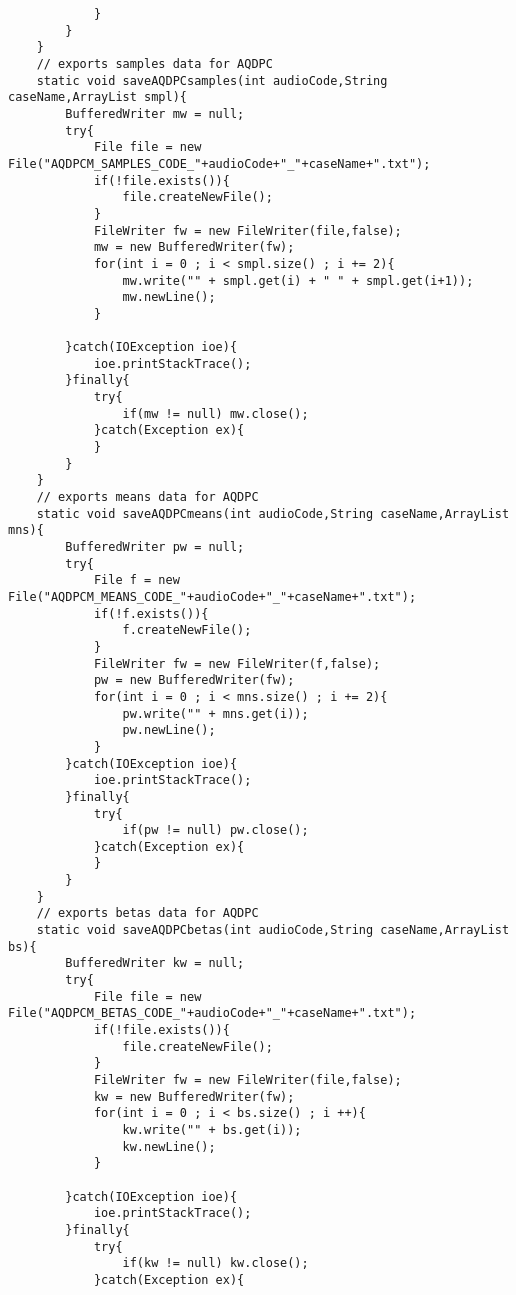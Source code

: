 \documentclass{article}
\begin{document}
\begin{lstlisting}
            }
        }
    }
    // exports samples data for AQDPC
    static void saveAQDPCsamples(int audioCode,String caseName,ArrayList smpl){
        BufferedWriter mw = null;
        try{
            File file = new File("AQDPCM_SAMPLES_CODE_"+audioCode+"_"+caseName+".txt");
            if(!file.exists()){
                file.createNewFile();
            }
            FileWriter fw = new FileWriter(file,false);
            mw = new BufferedWriter(fw);
            for(int i = 0 ; i < smpl.size() ; i += 2){
                mw.write("" + smpl.get(i) + " " + smpl.get(i+1));
                mw.newLine();
            }

        }catch(IOException ioe){
            ioe.printStackTrace();
        }finally{
            try{
                if(mw != null) mw.close();
            }catch(Exception ex){
            }
        }
    }
    // exports means data for AQDPC
    static void saveAQDPCmeans(int audioCode,String caseName,ArrayList mns){
        BufferedWriter pw = null;
        try{
            File f = new File("AQDPCM_MEANS_CODE_"+audioCode+"_"+caseName+".txt");
            if(!f.exists()){
                f.createNewFile();
            }
            FileWriter fw = new FileWriter(f,false);
            pw = new BufferedWriter(fw);
            for(int i = 0 ; i < mns.size() ; i += 2){
                pw.write("" + mns.get(i));
                pw.newLine();
            }
        }catch(IOException ioe){
            ioe.printStackTrace();
        }finally{
            try{
                if(pw != null) pw.close();
            }catch(Exception ex){
            }
        }
    }
    // exports betas data for AQDPC
    static void saveAQDPCbetas(int audioCode,String caseName,ArrayList bs){
        BufferedWriter kw = null;
        try{
            File file = new File("AQDPCM_BETAS_CODE_"+audioCode+"_"+caseName+".txt");
            if(!file.exists()){
                file.createNewFile();
            }
            FileWriter fw = new FileWriter(file,false);
            kw = new BufferedWriter(fw);
            for(int i = 0 ; i < bs.size() ; i ++){
                kw.write("" + bs.get(i));
                kw.newLine();
            }

        }catch(IOException ioe){
            ioe.printStackTrace();
        }finally{
            try{
                if(kw != null) kw.close();
            }catch(Exception ex){


\end{lstlisting}
\end{document}
